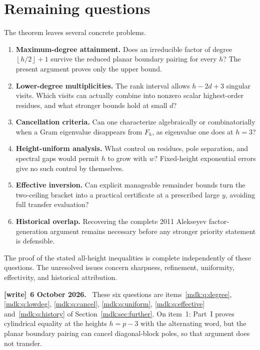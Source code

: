 \documentclass[11pt,letterpaper]{article}
\numberwithin{equation}{section}
\theoremstyle{remark}\newtheorem{remark}[theorem]{Remark}
\newcommand{\floor}[1]{\left\lfloor #1\right\rfloor}
\newenvironment{writenote}[1][]{\par\smallskip\begingroup\small
 \noindent\textbf{[write]}\if\relax\detokenize{#1}\relax\else~\textbf{#1.}\fi\ }%
 {\par\endgroup\smallskip}
\begin{document}
\section{Remaining questions}\label{mdk:pl:sec:remaining}
The theorem leaves several concrete problems.
\begin{enumerate}
\item \textbf{Maximum-degree attainment.} Does an irreducible factor of degree $\floor{h/2}+1$ survive the reduced planar boundary pairing for every $h$? The present argument proves only the upper bound.
\item \textbf{Lower-degree multiplicities.} The rank interval allows $h-2d+3$ singular visits. Which visits can actually combine into nonzero scalar highest-order residues, and what stronger bounds hold at small $d$?
\item \textbf{Cancellation criteria.} Can one characterize algebraically or combinatorially when a Gram eigenvalue disappears from $F_h$, as eigenvalue one does at $h=3$?
\item \textbf{Height-uniform analysis.} What control on residues, pole separation, and spectral gaps would permit $h$ to grow with $w$? Fixed-height exponential errors give no such control by themselves.
\item \textbf{Effective inversion.} Can explicit manageable remainder bounds turn the two-ceiling bracket into a practical certificate at a prescribed large $y$, avoiding full transfer evaluation?
\item \textbf{Historical overlap.} Recovering the complete 2011 Alekseyev factor-generation argument remains necessary before any stronger priority statement is defensible.
\end{enumerate}
The proof of the stated all-height inequalities is complete independently of these questions. The unresolved issues concern sharpness, refinement, uniformity, effectivity, and historical attribution.
\begin{writenote}[6 October 2026]
These six questions are items~\ref{mdk:q:degree}, \ref{mdk:q:lowdeg}, \ref{mdk:q:cancel}, \ref{mdk:q:uniform}, \ref{mdk:q:effective} and~\ref{mdk:q:history} of Section~\ref{mdk:sec:further}. On item~1: Part~I proves cylindrical equality at the heights $h=p-3$ with the alternating word, but the planar boundary pairing can cancel diagonal-block poles, so that argument does not transfer.
\end{writenote}
\end{document}
